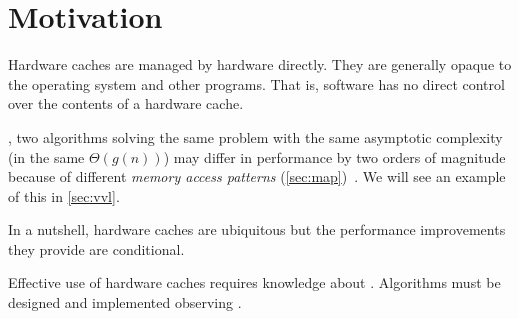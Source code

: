 \section{Motivation} %

Hardware caches are managed by hardware directly.  They are generally opaque to the
operating system and other programs.  That is, software has no direct control over the
contents of a hardware cache.

, two algorithms solving the same
problem with the same asymptotic complexity (in the same \(\Theta(g(n))\)) may differ in
performance by two orders of magnitude because of different \emph{memory access
patterns} (\cref{sec:map})~\cite{bigos}.  We will see an example of this in
\cref{sec:vvl}.

In a nutshell, hardware caches are ubiquitous but the performance improvements they
provide are conditional.
\begin{comment}
   To use them effectively,
   algorithms must be designed and implemented with the architecture
   of hardware caches in mind.
\end{comment}
Effective use of hardware caches requires knowledge about .  Algorithms must be designed and implemented observing .


